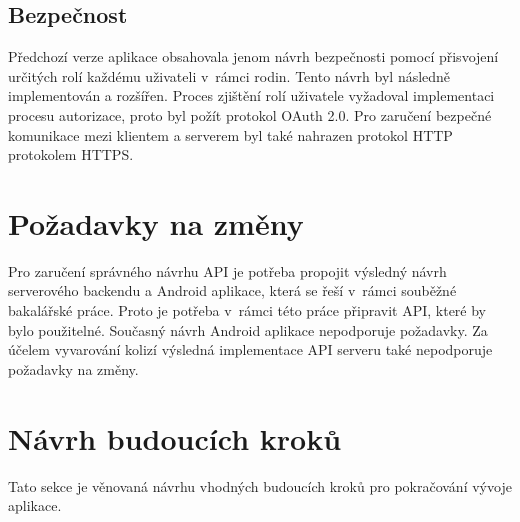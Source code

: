     \subsection{Bezpečnost}
        Předchozí verze aplikace obsahovala jenom návrh bezpečnosti pomocí přisvojení určitých rolí každému uživateli v~rámci rodin. Tento návrh byl následně implementován a rozšířen. Proces zjištění rolí uživatele vyžadoval implementaci procesu autorizace, proto byl požít protokol OAuth 2.0. Pro zaručení bezpečné komunikace mezi klientem a serverem byl také nahrazen protokol HTTP protokolem HTTPS.
        
        
    \section{Požadavky na změny}
        Pro zaručení správného návrhu API je potřeba propojit výsledný návrh serverového backendu a Android aplikace, která se řeší v~rámci souběžné bakalářské práce. Proto je potřeba v~rámci této  práce připravit API, které by bylo použitelné. Současný návrh Android aplikace nepodporuje požadavky. Za účelem vyvarování kolizí výsledná implementace API serveru také nepodporuje požadavky na změny.

\section{Návrh budoucích kroků}
    Tato sekce je věnovaná návrhu vhodných budoucích kroků pro pokračování vývoje aplikace.
    
